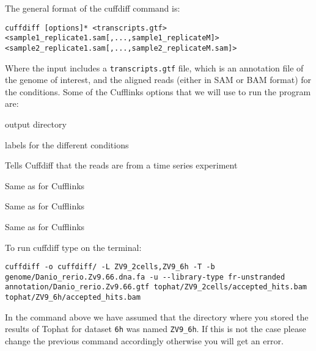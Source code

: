 \begin{information}
The general format of the cuffdiff command is:
\begin{lstlisting}
cuffdiff [options]* <transcripts.gtf> <sample1_replicate1.sam[,...,sample1_replicateM]> <sample2_replicate1.sam[,...,sample2_replicateM.sam]>
\end{lstlisting}

Where the input includes a \texttt{transcripts.gtf} file, which is an annotation
file of the genome of interest, and the aligned reads (either in SAM or BAM
format) for the conditions.
Some of the Cufflinks options that we will use to run the program are:
\begin{description}[style=multiline,labelindent=0cm,align=right,leftmargin=\descriptionlabelspace,rightmargin=1.5cm,font=\ttfamily]
  \item[-o] output directory
  \item[-L] labels for the different conditions
  \item[-T] Tells Cuffdiff that the reads are from a time series experiment
  \item[-b] Same as for Cufflinks
  \item[-u] Same as for Cufflinks
  \item[--library-type] Same as for Cufflinks
\end{description}
\end{information}

\begin{steps}
To run cuffdiff type on the terminal:
\begin{lstlisting}
cuffdiff -o cuffdiff/ -L ZV9_2cells,ZV9_6h -T -b genome/Danio_rerio.Zv9.66.dna.fa -u --library-type fr-unstranded annotation/Danio_rerio.Zv9.66.gtf tophat/ZV9_2cells/accepted_hits.bam tophat/ZV9_6h/accepted_hits.bam
\end{lstlisting}
\end{steps}

\begin{warning}
In the command above we have assumed that the directory where you stored the
results of Tophat for dataset \texttt{6h} was named \texttt{ZV9\_6h}. If this
is not the case please change the previous command accordingly otherwise you
will get an error.
\end{warning}

